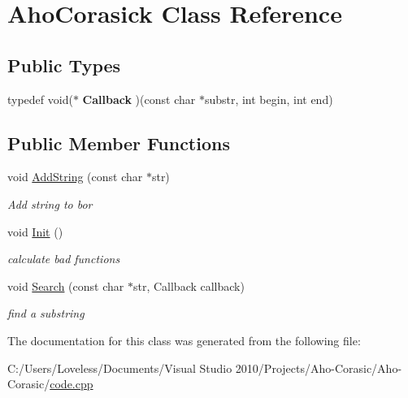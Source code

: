 \hypertarget{class_aho_corasick}{\section{Aho\-Corasick Class Reference}
\label{class_aho_corasick}
}
\subsection*{Public Types}
\begin{DoxyCompactItemize}
\item 
\hypertarget{class_aho_corasick_ad5f838754110ec9fa70f90b4575c8721}{typedef void($\ast$ {\bfseries Callback} )(const char $\ast$substr, int begin, int end)}\label{class_aho_corasick_ad5f838754110ec9fa70f90b4575c8721}

\end{DoxyCompactItemize}
\subsection*{Public Member Functions}
\begin{DoxyCompactItemize}
\item 
\hypertarget{class_aho_corasick_af5f51359074bcc78865bde3196e88d8b}{void \hyperlink{class_aho_corasick_af5f51359074bcc78865bde3196e88d8b}{Add\-String} (const char $\ast$str)}\label{class_aho_corasick_af5f51359074bcc78865bde3196e88d8b}

\begin{DoxyCompactList}\small\item\em Add string to bor \end{DoxyCompactList}\item 
\hypertarget{class_aho_corasick_a4461c6a9aa877777a872bd3820497f6f}{void \hyperlink{class_aho_corasick_a4461c6a9aa877777a872bd3820497f6f}{Init} ()}\label{class_aho_corasick_a4461c6a9aa877777a872bd3820497f6f}

\begin{DoxyCompactList}\small\item\em calculate bad functions \end{DoxyCompactList}\item 
\hypertarget{class_aho_corasick_a7848266d534754d949afe214670955c3}{void \hyperlink{class_aho_corasick_a7848266d534754d949afe214670955c3}{Search} (const char $\ast$str, Callback callback)}\label{class_aho_corasick_a7848266d534754d949afe214670955c3}

\begin{DoxyCompactList}\small\item\em find a substring \end{DoxyCompactList}\end{DoxyCompactItemize}


The documentation for this class was generated from the following file\-:\begin{DoxyCompactItemize}
\item 
C\-:/\-Users/\-Loveless/\-Documents/\-Visual Studio 2010/\-Projects/\-Aho-\/\-Corasic/\-Aho-\/\-Corasic/\hyperlink{code_8cpp}{code.\-cpp}\end{DoxyCompactItemize}
